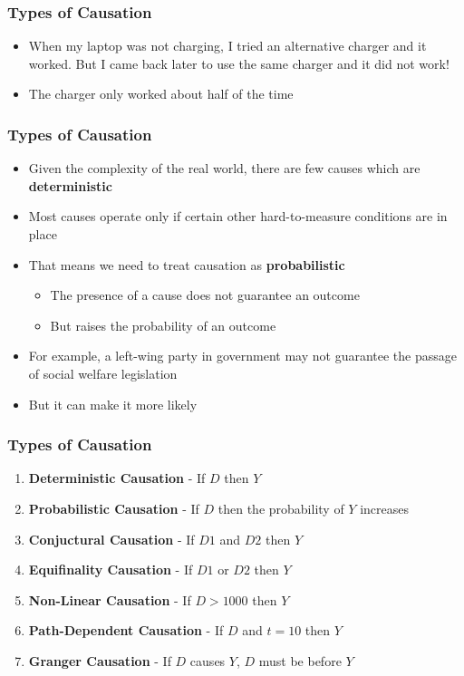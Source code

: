 \documentclass[xcolor=x11names,compress]{beamer}\usepackage[]{graphicx}\usepackage[]{color}
\renewcommand{\(}{\begin{columns}}
\renewcommand{\)}{\end{columns}}
\newcommand{\<}[1]{\begin{column}{#1}}
\renewcommand{\>}{\end{column}}
\begin{document}
\begin{frame}
\frametitle{Types of Causation}
\begin{itemize}
\item When my laptop was not charging, I tried an alternative charger and it worked. But I came back later to use the same charger and it did not work! 
\pause
\item The charger only worked about half of the time
\end{itemize}
\end{frame}

\begin{frame}
\frametitle{Types of Causation}
\begin{itemize}
\item Given the complexity of the real world, there are few causes which are \textbf{deterministic}
\pause
\item Most causes operate only if certain other hard-to-measure conditions are in place
\pause
\item That means we need to treat causation as \textbf{probabilistic}
\pause
\begin{itemize}
\item The presence of a cause does not guarantee an outcome
\item But raises the probability of an outcome
\pause
\end{itemize}
\item For example, a left-wing party in government may not guarantee the passage of social welfare legislation
\item But it can make it more likely
\end{itemize}
\end{frame}

\begin{frame}
\frametitle{Types of Causation}
\begin{enumerate}
\item \textbf{Deterministic Causation} - If $D$ then $Y$
\pause
\item \textbf{Probabilistic Causation} - If $D$ then the probability of $Y$ increases
\pause
\item \textbf{Conjuctural Causation} - If $D1$ and $D2$ then $Y$
\pause
\item \textbf{Equifinality Causation} - If $D1$ or $D2$ then $Y$
\pause
\item \textbf{Non-Linear Causation} - If $D>1000$ then $Y$
\pause
\item \textbf{Path-Dependent Causation} - If $D$ and $t=10$ then $Y$
\pause
\item \textbf{Granger Causation} - If $D$ causes $Y$, $D$ must be before $Y$
\end{enumerate}
\end{frame}
\end{document}
